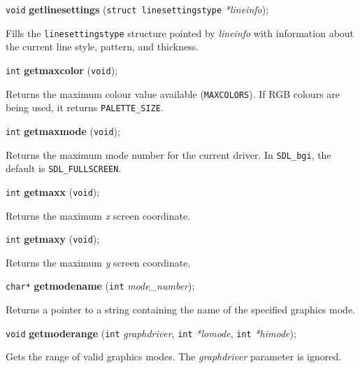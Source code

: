\documentclass[a4paper,11pt]{article}
\newcommand{\SDLbgi}{\texttt{SDL\_bgi}}
\newcommand{\V}{\texttt{void}}      %
\newcommand{\I}{\texttt{int}}       %
\newcommand{\func}[1]{\textbf{#1}}  %
\newcommand{\A}[1]{\emph{#1}}       %
\newcommand{\T}[1]{\texttt{#1}}     %
\newenvironment{bgi}
{ %
  \begin{snugshade}
}
{ %
  \end{snugshade}
}
\begin{document}

\begin{bgi}
\V{} \func{getlinesettings} (\texttt{struct linesettingstype}
\A{*lineinfo});
\end{bgi}

Fills the \texttt{linesettingstype} structure pointed by \A{lineinfo}
with information about the current line style, pattern, and thickness.


\begin{bgi}
\I{} \func{getmaxcolor} (\V{});
\end{bgi}

Returns the maximum colour value available (\T{MAXCOLORS}). If RGB
colours are being used, it returns \T{PALETTE\_SIZE}.


\begin{bgi}
\I{} \func{getmaxmode} (\V{}); 
\end{bgi}

Returns the maximum mode number for the current driver. In \SDLbgi,
the default is \T{SDL\_FULLSCREEN}.


\begin{bgi}
\I{} \func{getmaxx} (\V{});
\end{bgi}

Returns the maximum \A{x} screen coordinate.


\begin{bgi}
\I{} \func{getmaxy} (\V{});
\end{bgi}

Returns the maximum \A{y} screen coordinate.


\begin{bgi}
\texttt{char*} \func{getmodename} (\I{} \A{mode\_number});
\end{bgi}

Returns a pointer to a string containing the name of the specified
graphics mode.


\begin{bgi}
\V{} \func{getmoderange} (\I{} \A{graphdriver}, \I{} \A{*lomode}, \I{}
\A{*himode});
\end{bgi}

Gets the range of valid graphics modes. The \A{graphdriver} parameter
is ignored.

\end{document}
